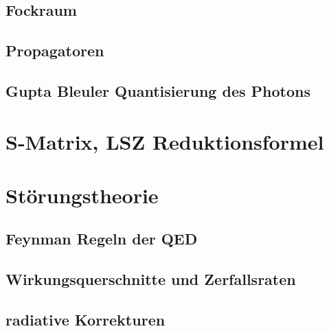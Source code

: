 \documentclass{include/thesisclass}
\begin{document}
\section{Fockraum}
\section{Propagatoren}
\section{Gupta Bleuler Quantisierung des Photons}

\chapter{S-Matrix, LSZ Reduktionsformel}

\chapter{Störungstheorie}	
\section{Feynman Regeln der QED}
\section{Wirkungsquerschnitte und Zerfallsraten}
\section{radiative Korrekturen}
\end{document}
